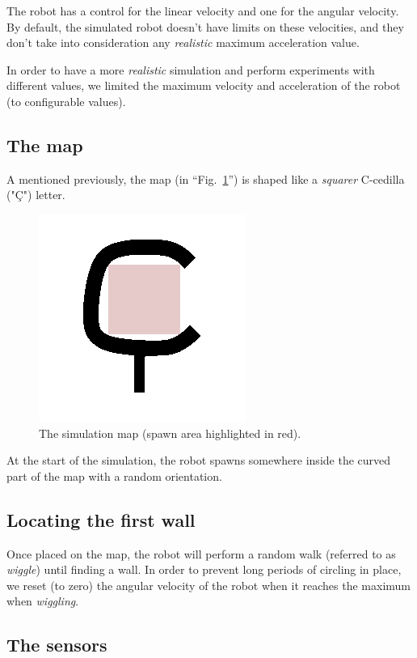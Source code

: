 \documentclass[conference]{IEEEtran}
\begin{document}
The robot has a control for the linear velocity and one for the angular velocity. By default, the simulated robot doesn't have limits on these velocities, and they don't take into consideration any \textit{realistic} maximum acceleration value.

In order to have a more \textit{realistic} simulation and perform experiments with different values, we limited the maximum velocity and acceleration of the robot (to configurable values).

\subsection{The map}

A mentioned previously, the map (in ``Fig.~\ref{fig:map}'') is shaped like a \textit{squarer} C-cedilla ("Ç") letter.

\begin{figure}[htbp]
    \centerline{\includegraphics{images/c.png}}
    \caption{The simulation map (spawn area highlighted in red).}
    \label{fig:map}
\end{figure}

At the start of the simulation, the robot spawns somewhere inside the curved part of the map with a random orientation.

\subsection{Locating the first wall}

Once placed on the map, the robot will perform a random walk (referred to as \emph{wiggle}) until finding a wall. In order to prevent long periods of circling in place, we reset (to zero) the angular velocity of the robot when it reaches the maximum when \emph{wiggling}.

\subsection{The sensors}
\end{document}

